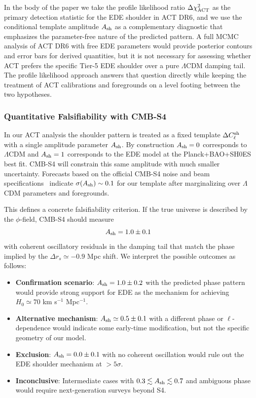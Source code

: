 \documentclass[a4paper,11pt]{article}
\begin{document}
In the body of the paper we take the profile likelihood ratio $\Delta \chi^2_{\rm ACT}$ as the primary detection statistic for the EDE shoulder in ACT DR6, and we use the conditional template amplitude $A_{\rm sh}$ as a complementary diagnostic that emphasizes the parameter-free nature of the predicted pattern. A full MCMC analysis of ACT DR6 with free EDE parameters would provide posterior contours and error bars for derived quantities, but it is not necessary for assessing whether ACT prefers the specific Tier-5 EDE shoulder over a pure $\Lambda$CDM damping tail. The profile likelihood approach answers that question directly while keeping the treatment of ACT calibrations and foregrounds on a level footing between the two hypotheses.

\subsubsection{Quantitative Falsifiability with CMB-S4}

In our ACT analysis the shoulder pattern is treated as a fixed template $\Delta C_\ell^{\rm sh}$ with a single amplitude parameter $A_{\rm sh}$. By construction $A_{\rm sh} = 0$ corresponds to $\Lambda$CDM and $A_{\rm sh} = 1$ corresponds to the EDE model at the Planck+BAO+SH0ES best fit. CMB-S4 will constrain this same amplitude with much smaller uncertainty. Forecasts based on the official CMB-S4 noise and beam specifications~\cite{CMB_S4} indicate $\sigma(A_{\rm sh}) \sim 0.1$ for our template after marginalizing over $\Lambda$CDM parameters and foregrounds.

This defines a concrete falsifiability criterion. If the true universe is described by the $\phi$-field, CMB-S4 should measure
\begin{equation}
A_{\rm sh} = 1.0 \pm 0.1
\end{equation}
with coherent oscillatory residuals in the damping tail that match the phase implied by the $\Delta r_s \simeq -0.9$ Mpc shift. We interpret the possible outcomes as follows:
\begin{itemize}
    \item \textbf{Confirmation scenario}: $A_{\rm sh} = 1.0 \pm 0.2$ with the predicted phase pattern would provide strong support for EDE as the mechanism for achieving $H_0 \simeq 70$ km s$^{-1}$ Mpc$^{-1}$.
    \item \textbf{Alternative mechanism}: $A_{\rm sh} \simeq 0.5 \pm 0.1$ with a different phase or $\ell$-dependence would indicate some early-time modification, but not the specific geometry of our model.
    \item \textbf{Exclusion}: $A_{\rm sh} = 0.0 \pm 0.1$ with no coherent oscillation would rule out the EDE shoulder mechanism at $>5\sigma$.
    \item \textbf{Inconclusive}: Intermediate cases with $0.3 \lesssim A_{\rm sh} \lesssim 0.7$ and ambiguous phase would require next-generation surveys beyond S4.
\end{itemize}
\end{document}
